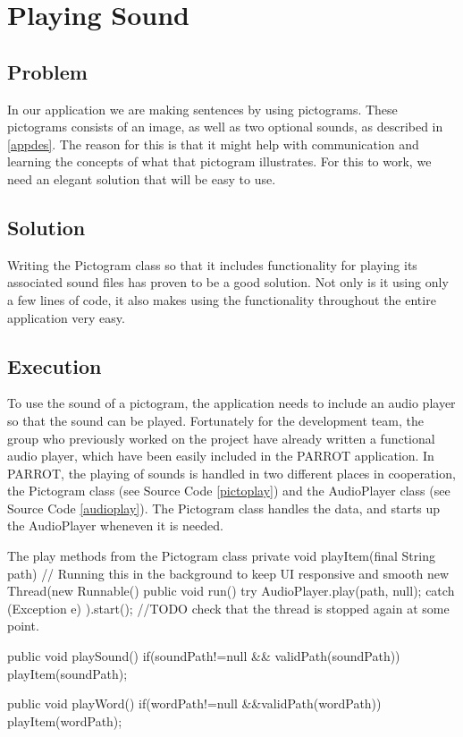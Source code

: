 \section{Playing Sound}
\subsection*{Problem}
In our application we are making sentences by using pictograms. These pictograms consists of an image, as well as two optional sounds, as described in \autoref{appdes}. The reason for this is that it might help with communication and learning the concepts of what that pictogram illustrates.
For this to work, we need an elegant solution that will be easy to use.

\subsection*{Solution}
Writing the Pictogram class so that it includes functionality for playing its associated sound files has proven to be a good solution. Not only is it using only a few lines of code, it also makes using the functionality throughout the entire application very easy.

\subsection*{Execution}
To use the sound of a pictogram, the application needs to include an audio player so that the sound can be played. Fortunately for the development team, the group who previously worked on the project have already written a functional audio player, which have been easily included in the PARROT application.\newline
In PARROT, the playing of sounds is handled in two different places in cooperation, the Pictogram class (see Source Code \ref{pictoplay}) and the AudioPlayer class (see Source Code \ref{audioplay}).\newline
The Pictogram class handles the data, and starts up the AudioPlayer wheneven it is needed.

\begin{source}[{pictoplay}]{The play methods from the Pictogram class}{}
	private void playItem(final String path) {
		// Running this in the background to keep UI responsive and smooth
		new Thread(new Runnable() {
			public void run() {
				try {
					AudioPlayer.play(path, null);
				} catch (Exception e) {
				}
			}
		}).start();
		//TODO check that the thread is stopped again at some point.
	}

	public void playSound()
	{
		if(soundPath!=null && validPath(soundPath))
		{
			playItem(soundPath);
		}
	}

	public void playWord()
	{
		if(wordPath!=null &&validPath(wordPath))
		{
			playItem(wordPath);
		}
	}
\end{source}

